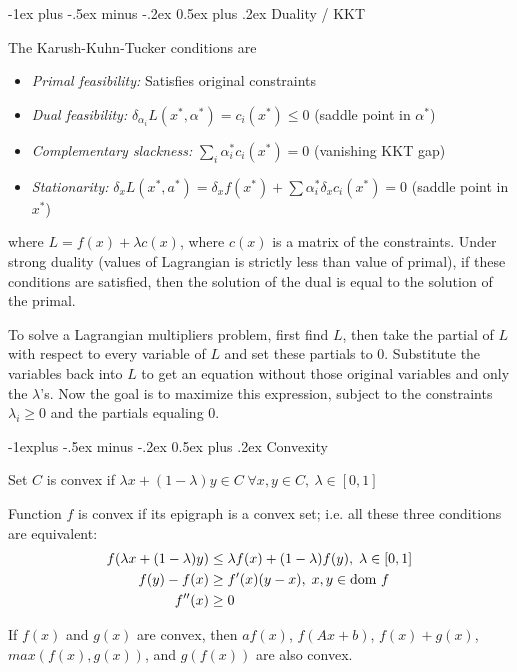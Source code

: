 \documentclass[10pt,landscape]{article}
\makeatletter
\renewcommand{\section}{\@startsection{section}{1}{0mm}%
                                {-1ex plus -.5ex minus -.2ex}%
                                {0.5ex plus .2ex}%
                                {\normalfont\large\bfseries}}
\renewcommand{\subsection}{\@startsection{subsection}{2}{0mm}%
                                {-1explus -.5ex minus -.2ex}%
                                {0.5ex plus .2ex}%
                                {\normalfont\normalsize\bfseries}}
\makeatother
\begin{document}
\begin{multicols}{3}
\section{Duality / KKT}

The Karush-Kuhn-Tucker conditions are
\begin{itemize}
	\item \emph{Primal feasibility:} Satisfies original constraints
	\item \emph{Dual feasibility:} $\delta_{\alpha_i} L(x^*, \alpha^*) = c_i(x^*) \leq 0$ (saddle point in $\alpha^*$)
	\item \emph{Complementary slackness:} $\sum_{i} \alpha_i^* c_i(x^*) = 0$ (vanishing KKT gap)
	\item \emph{Stationarity:} $\delta_x L(x^*, a^*) = \delta_x f(x^*) + \sum \alpha_i^* \delta_x c_i(x^*) = 0$ (saddle point in $x^*$)
\end{itemize}
where $L = f(x) + \lambda c(x)$, where $c(x)$ is a matrix of the constraints. Under strong duality (values of Lagrangian is strictly less than value of primal), if these conditions are satisfied, then the solution of the dual is equal to the solution of the primal.

To solve a Lagrangian multipliers problem, first find $L$, then take the partial of $L$ with respect to every variable of $L$ and set these partials to 0. Substitute the variables back into $L$ to get an equation without those original variables and only the $\lambda$'s. Now the goal is to maximize this expression, subject to the constraints $\lambda_i \geq 0$ and the partials equaling 0.

\subsection{Convexity}

Set $C$ is convex if $\lambda x + (1 - \lambda) y \in C\;\forall x,y \in C,\:\lambda \in [0,1]$

Function $f$ is convex if its epigraph is a convex set; i.e. all these three conditions are equivalent:
\begin{align*}
f(\lambda x + (1 - \lambda) y) &\leq \lambda f(x) + (1 - \lambda) f(y), \; \lambda \in [0,1]\\
f(y) - f(x) &\geq f'(x) (y - x), \; x,y \in \textmd{dom }f\\
f''(x) &\geq 0
\end{align*}

If $f(x)$ and $g(x)$ are convex, then $a f(x)$, $f(Ax + b)$, $f(x) + g(x)$, $max(f(x), g(x))$, and $g(f(x))$ are also convex.


\end{multicols}
\end{document}
